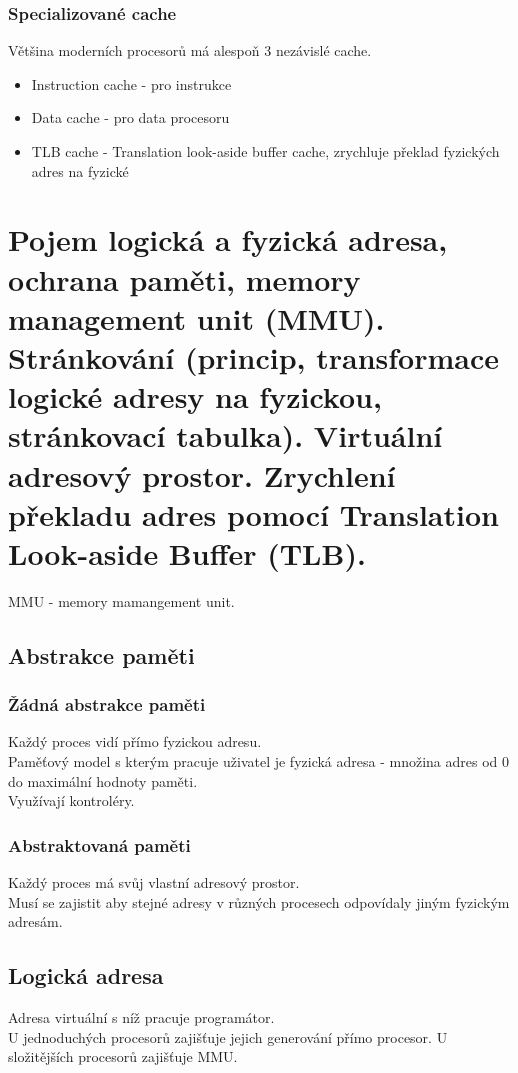 \subsubsection*{Specializované cache}
Většina moderních procesorů má alespoň 3 nezávislé cache.\\
\begin{itemize}
    \item Instruction cache - pro instrukce
    \item Data cache - pro data procesoru
    \item TLB cache - Translation look-aside buffer cache, zrychluje překlad fyzických adres na fyzické
\end{itemize}

\section{Pojem logická a fyzická adresa, ochrana paměti, memory management unit (MMU). Stránkování (princip, transformace logické adresy na fyzickou, stránkovací tabulka). Virtuální adresový prostor. Zrychlení překladu adres pomocí Translation Look-aside Buffer (TLB).}

MMU - memory mamangement unit. \\
\subsection{Abstrakce paměti}
\subsubsection*{Žádná abstrakce paměti}
Každý proces vidí přímo fyzickou adresu.\\
Paměťový model s kterým pracuje uživatel je fyzická adresa - množina adres od 0 do maximální hodnoty paměti.\\
Využívají kontroléry.\\
\subsubsection*{Abstraktovaná paměti}
Každý proces má svůj vlastní adresový prostor.\\
Musí se zajistit aby stejné adresy v různých procesech odpovídaly jiným fyzickým adresám.\\

\subsection{Logická adresa}
Adresa virtuální s níž pracuje programátor.\\
U jednoduchých procesorů zajišťuje jejich generování přímo procesor. U složitějších procesorů zajišťuje MMU.

